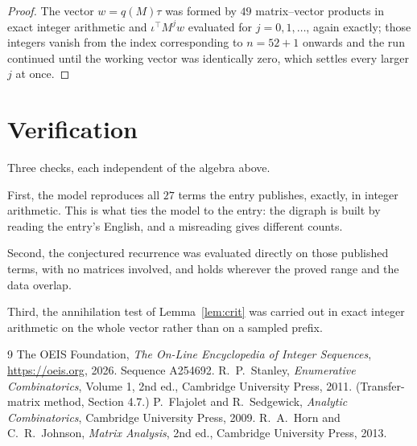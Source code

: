 \documentclass[11pt,a4paper]{article}
\theoremstyle{plain}
\theoremstyle{definition}
\begin{document}
\begin{proof}
The vector $w=q(M)\tau$ was formed by $49$ matrix--vector products in exact integer
arithmetic and $\iota^{\!\top}M^{j}w$ evaluated for $j=0,1,\dots$, again exactly; those
integers vanish from the index corresponding to $n=52+1$ onwards and the run continued
until the working vector was identically zero, which settles every larger $j$ at once.
\end{proof}

\section{Verification}

Three checks, each independent of the algebra above.

First, the model reproduces all $27$ terms the entry publishes, exactly, in integer
arithmetic. This is what ties the model to the entry: the digraph is built by reading the
entry's English, and a misreading gives different counts.

Second, the conjectured recurrence was evaluated directly on those published terms, with no
matrices involved, and holds wherever the proved range and the data overlap.

Third, the annihilation test of Lemma~\ref{lem:crit} was carried out in exact integer
arithmetic on the whole vector rather than on a sampled prefix.

\begin{thebibliography}{9}
 The OEIS Foundation, \emph{The On-Line Encyclopedia of Integer
Sequences}, \url{https://oeis.org}, 2026. Sequence A254692.
 R.~P.~Stanley, \emph{Enumerative Combinatorics}, Volume 1, 2nd ed.,
Cambridge University Press, 2011. (Transfer-matrix method, Section 4.7.)
 P.~Flajolet and R.~Sedgewick, \emph{Analytic Combinatorics}, Cambridge
University Press, 2009.
 R.~A.~Horn and C.~R.~Johnson, \emph{Matrix Analysis}, 2nd ed., Cambridge
University Press, 2013.
\end{thebibliography}
\end{document}
